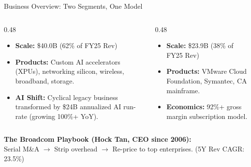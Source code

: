 \documentclass[aspectratio=169,10pt]{beamer}
\begin{document}
\begin{frame}{Business Overview: Two Segments, One Model}
  \begin{columns}[T]
    \begin{column}{0.48\textwidth}
      \vspace{0.5cm}
      \begin{itemize}
        \item \textbf{Scale:} \$40.0B (62\% of FY25 Rev)
        \item \textbf{Products:} Custom AI accelerators (XPUs), networking silicon, wireless, broadband, storage.
        \item \textbf{AI Shift:} Cyclical legacy business transformed by \$24B annualized AI run-rate (growing 100\%+ YoY).
      \end{itemize}
    \end{column}
    \begin{column}{0.48\textwidth}
      \vspace{0.5cm}
      \begin{itemize}
        \item \textbf{Scale:} \$23.9B (38\% of FY25 Rev)
        \item \textbf{Products:} VMware Cloud Foundation, Symantec, CA mainframe.
        \item \textbf{Economics:} 92\%+ gross margin subscription model.
      \end{itemize}
    \end{column}
  \end{columns}
  
  \vspace{0.8cm}
  \begin{center}
    \small\textbf{The Broadcom Playbook (Hock Tan, CEO since 2006):}\\
    Serial M\&A $\rightarrow$ Strip overhead $\rightarrow$ Re-price to top enterprises. (5Y Rev CAGR: 23.5\%)
  \end{center}
\end{frame}
\end{document}
